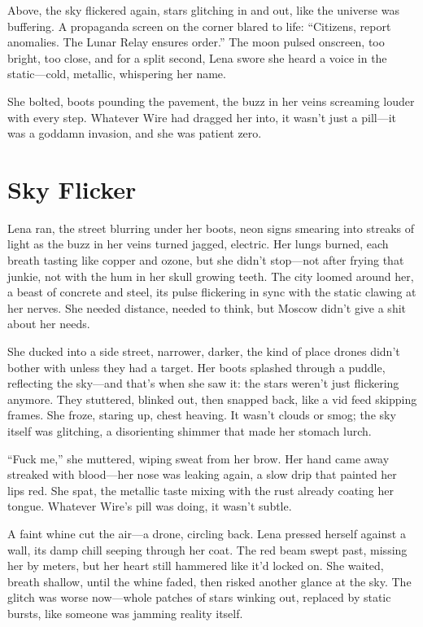 \documentclass[12pt]{book}
\begin{document}
Above, the sky flickered again, stars glitching in and out, like the universe was buffering. A propaganda screen on the corner blared to life: ``Citizens, report anomalies. The Lunar Relay ensures order.'' The moon pulsed onscreen, too bright, too close, and for a split second, Lena swore she heard a voice in the static---cold, metallic, whispering her name.

She bolted, boots pounding the pavement, the buzz in her veins screaming louder with every step. Whatever Wire had dragged her into, it wasn’t just a pill---it was a goddamn invasion, and she was patient zero.

\section{Sky Flicker}

Lena ran, the street blurring under her boots, neon signs smearing into streaks of light as the buzz in her veins turned jagged, electric. Her lungs burned, each breath tasting like copper and ozone, but she didn’t stop---not after frying that junkie, not with the hum in her skull growing teeth. The city loomed around her, a beast of concrete and steel, its pulse flickering in sync with the static clawing at her nerves. She needed distance, needed to think, but Moscow didn’t give a shit about her needs.

She ducked into a side street, narrower, darker, the kind of place drones didn’t bother with unless they had a target. Her boots splashed through a puddle, reflecting the sky---and that’s when she saw it: the stars weren’t just flickering anymore. They stuttered, blinked out, then snapped back, like a vid feed skipping frames. She froze, staring up, chest heaving. It wasn’t clouds or smog; the sky itself was glitching, a disorienting shimmer that made her stomach lurch.

``Fuck me,'' she muttered, wiping sweat from her brow. Her hand came away streaked with blood---her nose was leaking again, a slow drip that painted her lips red. She spat, the metallic taste mixing with the rust already coating her tongue. Whatever Wire’s pill was doing, it wasn’t subtle.

A faint whine cut the air---a drone, circling back. Lena pressed herself against a wall, its damp chill seeping through her coat. The red beam swept past, missing her by meters, but her heart still hammered like it’d locked on. She waited, breath shallow, until the whine faded, then risked another glance at the sky. The glitch was worse now---whole patches of stars winking out, replaced by static bursts, like someone was jamming reality itself.
\end{document}
